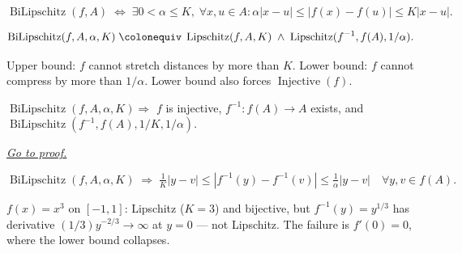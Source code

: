 \begin{remark*}
\[
  \operatorname{BiLipschitz}(f,A)
  \;\iff\;
  \exists 0<\alpha\leq K,\;\forall x,u\in A:
  \alpha|x-u|\leq|f(x)-f(u)|\leq K|x-u|.
\]
\end{remark*}

\begin{remark*}
\[
  \operatorname{BiLipschitz}(f,A,\alpha,K)
  \;\colonequiv\;
  \operatorname{Lipschitz}(f,A,K)
  \;\wedge\;
  \operatorname{Lipschitz}(f^{-1},f(A),1/\alpha).
\]
\end{remark*}

\begin{remark*}[Interpretation]
Upper bound: $f$ cannot stretch distances by more than $K$.
Lower bound: $f$ cannot compress by more than $1/\alpha$.
Lower bound also forces $\operatorname{Injective}(f)$.
\end{remark*}


\begin{theorem}
\label{thm:bilipschitz-inverse-is-lipschitz}
$\operatorname{BiLipschitz}(f,A,\alpha,K)\Rightarrow$
$f$ is injective, $f^{-1}:f(A)\to A$ exists, and
$\operatorname{BiLipschitz}(f^{-1},f(A),1/K,1/\alpha)$.

\smallskip\noindent
\hyperref[prf:bilipschitz-inverse-is-lipschitz]{\textit{Go to proof.}}
\end{theorem}

\begin{remark*}
\[
  \operatorname{BiLipschitz}(f,A,\alpha,K)
  \;\Rightarrow\;
  \tfrac{1}{K}|y-v|\leq|f^{-1}(y)-f^{-1}(v)|\leq\tfrac{1}{\alpha}|y-v|
  \quad\forall y,v\in f(A).
\]
\end{remark*}

\begin{remark*}
$f(x)=x^3$ on $[-1,1]$: Lipschitz ($K=3$) and bijective, but
$f^{-1}(y)=y^{1/3}$ has derivative $(1/3)y^{-2/3}\to\infty$ at
$y=0$ — not Lipschitz. The failure is $f'(0)=0$, where the lower
bound collapses.
\end{remark*}

